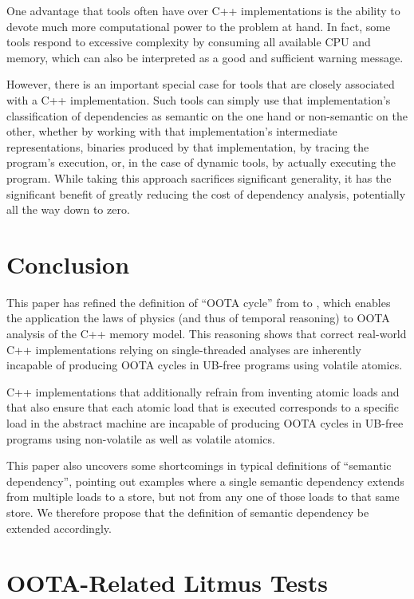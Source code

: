 \documentclass[10]{article}
\begin{document}
One advantage that tools often have over C++ implementations is the
ability to devote much more computational power to the problem at hand.
In fact, some tools respond to excessive complexity by consuming all
available CPU and memory, which can also be interpreted as a good and
sufficient warning message.

However, there is an important special case for tools that are closely
associated with a C++ implementation.
Such tools can simply use that implementation's classification of
dependencies as semantic on the one hand or non-semantic on the
other, whether by working with that implementation's intermediate
representations, binaries produced by that implementation, by tracing
the program's execution, or, in the case of dynamic tools, by actually
executing the program.
While taking this approach sacrifices significant generality, it has the
significant benefit of greatly reducing the cost of dependency analysis,
potentially all the way down to zero.

\section{Conclusion}
\label{sec:Conclusion}

This paper has refined the definition of ``OOTA cycle'' from
 to , which enables the
application the laws of physics (and thus of temporal reasoning) to OOTA
analysis of the C++ memory model.
This reasoning shows that correct real-world C++ implementations relying
on single-threaded analyses are inherently incapable of producing OOTA
cycles in UB-free programs using volatile atomics.

C++ implementations that additionally refrain from inventing atomic loads
and that also ensure that each atomic load that is executed corresponds
to a specific load in the abstract machine are incapable of producing
OOTA cycles in UB-free programs using non-volatile as well
as volatile atomics.

This paper also uncovers some shortcomings in typical definitions of
``semantic dependency'', pointing out examples where a single semantic
dependency extends from multiple loads to a store, but not from any one
of those loads to that same store.
We therefore propose that the definition of semantic dependency be
extended accordingly.

\clearpage
\appendix

\section{OOTA-Related Litmus Tests}
\label{app:OOTA-Related Litmus Tests}
\end{document}
